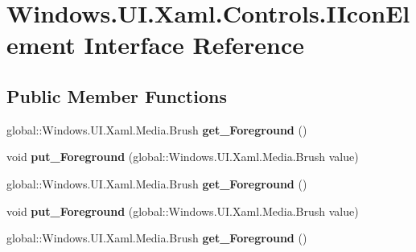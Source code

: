 \hypertarget{interface_windows_1_1_u_i_1_1_xaml_1_1_controls_1_1_i_icon_element}{}\section{Windows.\+U\+I.\+Xaml.\+Controls.\+I\+Icon\+Element Interface Reference}
\label{interface_windows_1_1_u_i_1_1_xaml_1_1_controls_1_1_i_icon_element}
\subsection*{Public Member Functions}
\begin{DoxyCompactItemize}
\item 
\mbox{\label{interface_windows_1_1_u_i_1_1_xaml_1_1_controls_1_1_i_icon_element_a7832c1c06d57ef178a429edea57105ac}} 
global\+::\+Windows.\+U\+I.\+Xaml.\+Media.\+Brush {\bfseries get\+\_\+\+Foreground} ()
\item 
\mbox{\label{interface_windows_1_1_u_i_1_1_xaml_1_1_controls_1_1_i_icon_element_a6c1f009c09bd4a70c641ee38502721f9}} 
void {\bfseries put\+\_\+\+Foreground} (global\+::\+Windows.\+U\+I.\+Xaml.\+Media.\+Brush value)
\item 
\mbox{\label{interface_windows_1_1_u_i_1_1_xaml_1_1_controls_1_1_i_icon_element_a7832c1c06d57ef178a429edea57105ac}} 
global\+::\+Windows.\+U\+I.\+Xaml.\+Media.\+Brush {\bfseries get\+\_\+\+Foreground} ()
\item 
\mbox{\label{interface_windows_1_1_u_i_1_1_xaml_1_1_controls_1_1_i_icon_element_a6c1f009c09bd4a70c641ee38502721f9}} 
void {\bfseries put\+\_\+\+Foreground} (global\+::\+Windows.\+U\+I.\+Xaml.\+Media.\+Brush value)
\item 
\mbox{\label{interface_windows_1_1_u_i_1_1_xaml_1_1_controls_1_1_i_icon_element_a7832c1c06d57ef178a429edea57105ac}} 
global\+::\+Windows.\+U\+I.\+Xaml.\+Media.\+Brush {\bfseries get\+\_\+\+Foreground} ()

\end{DoxyCompactItemize}
